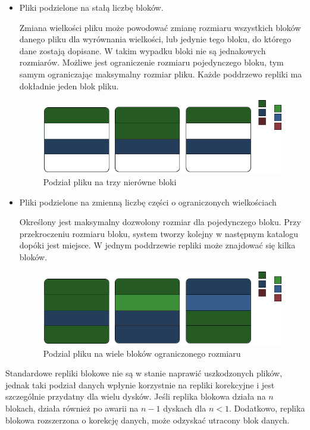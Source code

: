 \begin{itemize}
    \item Pliki podzielone na stałą liczbę bloków. 

            Zmiana wielkości pliku może powodować zmianę rozmiaru wszystkich bloków 
            danego pliku dla wyrównania wielkości, 
            lub jedynie tego bloku, do którego dane zostają dopisane. 
            W takim wypadku bloki nie są jednakowych rozmiarów. 
            Możliwe jest ograniczenie rozmiaru pojedynczego bloku, 
            tym samym ograniczając maksymalny rozmiar pliku. 
            Każde poddrzewo repliki ma dokładnie jeden blok pliku.
            \begin{figure}[h!]
                    \centering
                    \includegraphics{BR-1.png}
                    \caption{Podział pliku na trzy nierówne bloki }
                    \label{fig:br1}
            \end{figure}
    \item Pliki podzielone na zmienną liczbę części o ograniczonych wielkościach

            Określony jest maksymalny dozwolony rozmiar dla pojedynczego bloku. 
            Przy przekroczeniu rozmiaru bloku, system tworzy kolejny w następnym katalogu 
            dopóki jest miejsce. W jednym poddrzewie repliki może znajdować się kilka bloków. 
            \begin{figure}[h!]
                    \centering
                    \includegraphics{BR-2.png}
                    \caption{Podzial pliku na wiele bloków ograniczonego rozmiaru}
                    \label{fig:br1}
            \end{figure}
 
\end{itemize}
Standardowe repliki blokowe nie są w stanie naprawić uszkodzonych plików, jednak taki podział danych wpłynie korzystnie na repliki korekcyjne i jest szczególnie przydatny dla wielu dysków. Jeśli replika blokowa działa na $n$ blokach, działa również po awarii na $n-1$ dyskach dla $n < 1$. Dodatkowo, replika blokowa rozszerzona o korekcję danych, może odzyskać utracony blok danych.

